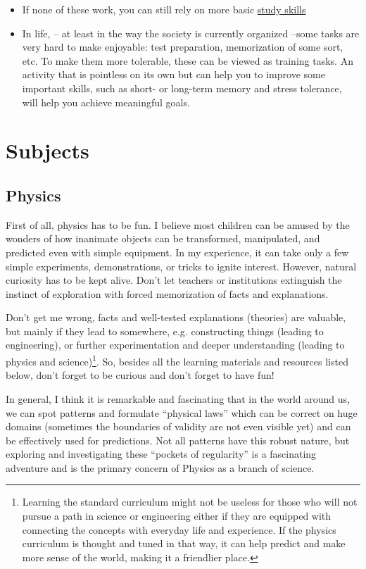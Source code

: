 \documentclass{article}
\begin{document}
\begin{itemize}
    \item If none of these work, you can still rely on more basic \href{https://en.wikipedia.org/wiki/Study_skills}{study skills}
    \item In life, -- at least in the way the society is currently organized --some tasks are very hard to make enjoyable: test preparation, memorization of some sort, etc. To make them more tolerable, these can be viewed as training tasks. An activity that is pointless on its own but can help you to improve some important skills, such as short- or long-term memory and stress tolerance, will help you achieve meaningful goals.
\end{itemize}

\section{Subjects}

\subsection{Physics}

First of all, physics has to be fun. I believe most children can be amused by the wonders of how inanimate objects can be transformed, manipulated, and predicted even with simple equipment. In my experience, it can take only a few simple experiments, demonstrations, or tricks to ignite interest.
However, natural curiosity has to be kept alive. Don't let teachers or institutions extinguish the instinct of exploration with forced memorization of facts and explanations.

Don't get me wrong, facts and well-tested explanations (theories) are valuable, but mainly if they lead to somewhere, e.g. constructing things (leading to engineering), or further experimentation and deeper understanding (leading to physics and science)\footnote{Learning the standard curriculum might not be useless for those who will not pursue a path in science or engineering either if they are equipped with connecting the concepts with everyday life and experience. If the physics curriculum is thought and tuned in that way, it can help predict and make more sense of the world, making it a friendlier place.}. So, besides all the learning materials and resources listed below, don't forget to be curious and don't forget to have fun! 

In general, I think it is remarkable and fascinating that in the world around us, we can spot patterns and formulate ``physical laws'' which can be correct on huge domains (sometimes the boundaries of validity are not even visible yet) and can be effectively used for predictions. Not all patterns have this robust nature, but exploring and investigating these ``pockets of regularity'' is a fascinating adventure and is the primary concern of Physics as a branch of science.
\end{document}
